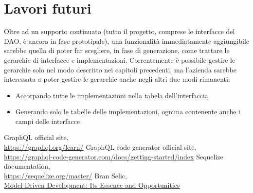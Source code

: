 \documentclass[a4paper, 12pt]{report}
\begin{document}
      \section*{Lavori futuri}
        Oltre ad un supporto continuato (tutto il progetto, comprese le interfacce del DAO, è ancora in fase prototipale), una funzionalità immediatamente aggiungibile sarebbe quella di poter far scegliere, in fase di generazione, come trattare le gerarchie di interfacce e implementazioni.
        Correntemente è possibile gestire le gerarchie solo nel modo descritto nei capitoli precedenti, ma l'azienda sarebbe interessata a poter gestire le gerarchie anche negli altri due modi rimanenti:
        \begin{itemize}
          \item Accorpando tutte le implementazioni nella tabela dell'interfaccia
          \item Generando solo le tabelle delle implementazioni, ognuna contenente anche i campi delle interfacce
        \end{itemize}
    \newpage
    \begin{thebibliography}{3}
      GraphQL official site,\\\href{https://graphql.org/learn/}{https://graphql.org/learn/}
      GraphQL code generator official site,\\\href{https://graphql-code-generator.com/docs/getting-started/index}{https://graphql-code-generator.com/docs/getting-started/index}
      Sequelize documentation,\\\href{https://sequelize.org/master/}{https://sequelize.org/master/}
      Bran Selic,\\\href{https://www.researchgate.net/publication/221249899_Model-Driven_Development_Its_Essence_and_Opportunities}{Model-Driven Development: Its Essence and Opportunities}
    \end{thebibliography}
\end{document}
